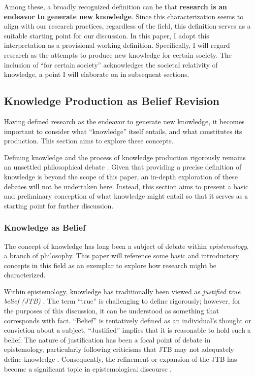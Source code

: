 \documentclass{article}
\begin{document}
Among these, a broadly recognized definition can be that \textbf{research is an endeavor to generate new knowledge}. Since this characterization seems to align with our research practices, regardless of the field, this definition serves as a suitable starting point for our discussion. In this paper, I adopt this interpretation as a provisional working definition. Specifically, I will regard research as the attempts to produce new knowledge for certain society. The inclusion of ``for certain society'' acknowledges the societal relativity of knowledge, a point I will elaborate on in subsequent sections.


\subsection{Knowledge Production as Belief Revision}
\label{section-knowledge-production-as-belief-revision}
Having defined research as the endeavor to generate new knowledge, it becomes important to consider what ``knowledge'' itself entails, and what constitutes its production. This section aims to explore these concepts.

Defining knowledge and the process of knowledge production rigorously remains an unsettled philosophical debate \cite{sep-epistemology}. Given that providing a precise definition of knowledge is beyond the scope of this paper, an in-depth exploration of these debates will not be undertaken here. Instead, this section aims to present a basic and preliminary conception of what knowledge might entail so that it serves as a starting point  for further discussion.

\subsubsection{Knowledge as Belief}
The concept of knowledge has long been a subject of debate within \textit{epistemology}, a branch of philosophy. This paper will reference some basic and introductory concepts in this field as an exemplar to explore how research might be characterized.

Within epistemology, knowledge has traditionally been viewed as \textit{justified true belief (JTB)} \cite{sep-epistemology}. The term ``true'' is challenging to define rigorously; however, for the purposes of this discussion, it can be understood as something that corresponds with fact. ``Belief'' is tentatively defined as an individual's thought or conviction about a subject. ``Justified'' implies that it is reasonable to hold such a belief. The nature of justification has been a focal point of debate in epistemology, particularly following criticisms that JTB may not adequately define knowledge \cite{gettier1963justified}. Consequently, the refinement or expansion of the JTB has become a significant topic in epistemological discourse \cite{sep-epistemology}.
\end{document}
